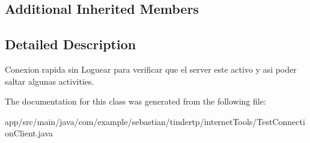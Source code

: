 \subsection*{Additional Inherited Members}


\subsection{Detailed Description}
Conexion rapida sin Loguear para verificar que el server este activo y asi poder saltar algunas activities. 

The documentation for this class was generated from the following file\+:\begin{DoxyCompactItemize}
\item 
app/src/main/java/com/example/sebastian/tindertp/internet\+Tools/Test\+Connection\+Client.\+java\end{DoxyCompactItemize}
